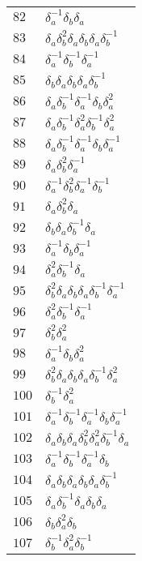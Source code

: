 \documentclass{article}
\begin{document}
\begin{center}
\begin{tabular}{ll}
$82$ & $\delta_a^{-1}\delta_b^{}\delta_a^{}$ \\
$83$ & $\delta_a^{}\delta_b^{2}\delta_a^{}\delta_b^{}\delta_a^{}\delta_b^{-1}$ \\
$84$ & $\delta_a^{-1}\delta_b^{-1}\delta_a^{-1}$ \\
$85$ & $\delta_b^{}\delta_a^{}\delta_b^{}\delta_a^{}\delta_b^{-1}$ \\
$86$ & $\delta_a^{}\delta_b^{-1}\delta_a^{-1}\delta_b^{}\delta_a^{2}$ \\
$87$ & $\delta_a^{}\delta_b^{-1}\delta_a^{2}\delta_b^{-1}\delta_a^{2}$ \\
$88$ & $\delta_a^{}\delta_b^{-1}\delta_a^{-1}\delta_b^{}\delta_a^{-1}$ \\
$89$ & $\delta_a^{}\delta_b^{2}\delta_a^{-1}$ \\
$90$ & $\delta_a^{-1}\delta_b^{2}\delta_a^{-1}\delta_b^{-1}$ \\
$91$ & $\delta_a^{}\delta_b^{2}\delta_a^{}$ \\
$92$ & $\delta_b^{}\delta_a^{}\delta_b^{-1}\delta_a^{}$ \\
$93$ & $\delta_a^{-1}\delta_b^{}\delta_a^{-1}$ \\
$94$ & $\delta_a^{2}\delta_b^{-1}\delta_a^{}$ \\
$95$ & $\delta_b^{2}\delta_a^{}\delta_b^{}\delta_a^{}\delta_b^{-1}\delta_a^{-1}$ \\
$96$ & $\delta_a^{2}\delta_b^{-1}\delta_a^{-1}$ \\
$97$ & $\delta_b^{2}\delta_a^{2}$ \\
$98$ & $\delta_a^{-1}\delta_b^{}\delta_a^{2}$ \\
$99$ & $\delta_b^{2}\delta_a^{}\delta_b^{}\delta_a^{}\delta_b^{-1}\delta_a^{2}$ \\
$100$ & $\delta_b^{-1}\delta_a^{2}$ \\
$101$ & $\delta_a^{-1}\delta_b^{-1}\delta_a^{-1}\delta_b^{}\delta_a^{-1}$ \\
$102$ & $\delta_a^{}\delta_b^{}\delta_a^{}\delta_b^{2}\delta_a^{2}\delta_b^{-1}\delta_a^{}$ \\
$103$ & $\delta_a^{-1}\delta_b^{-1}\delta_a^{-1}\delta_b^{}$ \\
$104$ & $\delta_a^{}\delta_b^{}\delta_a^{}\delta_b^{}\delta_a^{}\delta_b^{-1}$ \\
$105$ & $\delta_a^{}\delta_b^{-1}\delta_a^{}\delta_b^{}\delta_a^{}$ \\
$106$ & $\delta_b^{}\delta_a^{2}\delta_b^{}$ \\
$107$ & $\delta_b^{-1}\delta_a^{2}\delta_b^{-1}$ \\

\end{tabular}
\end{center}
\end{document}
